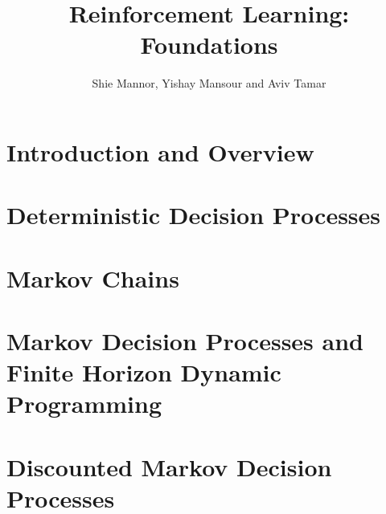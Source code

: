 \documentclass[12pt]{book}
\title{Reinforcement Learning: Foundations}
\date{February 2022
\\
  \textcolor{red}{This book is still work in progress. In particular, references to literature are not complete. We would be grateful for notification about errors or comments of any kind, at \url{rlfoundationsbook@gmail.com}. }

}                                           %
\author{Shie Mannor, Yishay Mansour and Aviv Tamar}
\begin{document}
\maketitle

\tableofcontents

\chapter{Introduction and Overview}
\label{chapter:intro}


\chapter{Deterministic Decision Processes}
\label{chapter:DDP}


%
%

\chapter{Markov Chains}
\label{chapter:MC}


\chapter{Markov Decision Processes and Finite Horizon Dynamic Programming}
\label{chapter:MDP-FH}




\chapter{Discounted Markov Decision Processes}
\label{chapter:disc}

% 

% 
\end{document}
